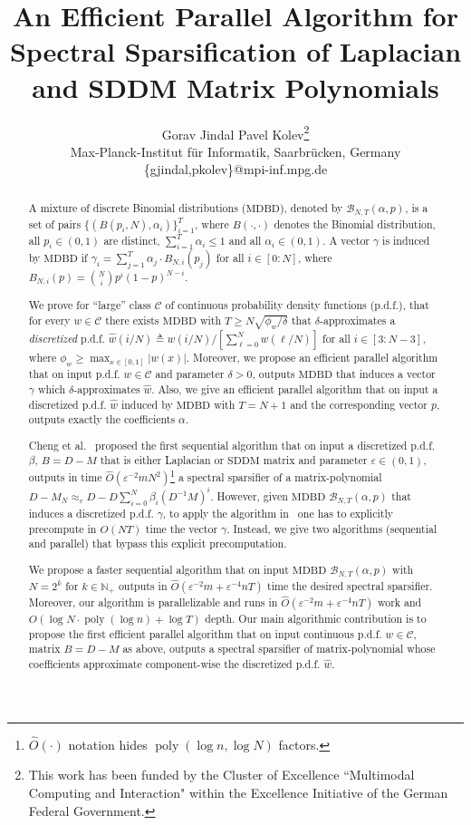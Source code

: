 \documentclass[11pt]{article}
\title{An Efficient Parallel Algorithm for Spectral Sparsification of Laplacian and SDDM Matrix Polynomials}
\author{
Gorav Jindal \qquad Pavel Kolev\footnote{This work has been funded by the Cluster of Excellence ``Multimodal Computing and Interaction" within the Excellence Initiative of the German Federal Government.}\\
Max-Planck-Institut f\"{u}r Informatik, Saarbr\"{u}cken, Germany\\
\{gjindal,pkolev\}@mpi-inf.mpg.de
}
\date{}
\newcommand{\phiw}{\phi_{w}}
\newcommand{\SDDM}{\mathrm{SDDM}}
\newcommand{\MDBD}{\mathrm{MDBD}}
\newcommand{\BNTap}{\mathcal{B}_{N,T}(\alpha,p)}
\newcommand{\hM}{\widehat{M}}
\newcommand{\hO}{\widehat{O}}
\newcommand{\hw}{\widehat{w}}
\newcommand{\Di}{D^{-1}}
\newcommand{\N}{\mathbb{N}}
\newcommand{\poly}{\operatorname{poly}}
\newcommand{\eps}{\epsilon}
\renewcommand{\leq}{\leqslant}
\renewcommand{\geq}{\geqslant}
\renewcommand{\eps}{\varepsilon}
\numberwithin{thm}{section}
\begin{document}
\maketitle

\begin{abstract}
A mixture of discrete Binomial distributions ($\MDBD$), denoted by $\BNTap$, is a set of pairs $\{(B(p_{i},N),\alpha_{i})\}_{i=1}^{T}$, where $B(\cdot,\cdot)$ denotes the Binomial distribution, all $p_{i}\in(0,1)$ are distinct, $\sum_{i=1}^{T}\alpha_{i}\leq1$ and all $\alpha_{i}\in(0,1)$. A vector $\gamma$ is induced by $\MDBD$ if $\gamma_{i}=\sum_{j=1}^{T}\alpha_{j}\cdot B_{N,i}(p_{j})$ for all $i\in[0:N]$, where $B_{N,i}(p)={N \choose i}p^{i}(1-p)^{N-i}$.

We prove for ``large'' class $\mathcal{C}$ of continuous probability density functions (p.d.f.), that for every $w\in\mathcal{C}$ there exists $\MDBD$ with $T\geq N\sqrt{\phiw/\delta}$ that $\delta$-approximates a \emph{discretized} p.d.f. $\widehat{w}(i/N)\triangleq w(i/N)/[\sum_{\ell=0}^{N}w(\ell/N)]$ for all $i\in[3:N-3]$, where $\phiw\geq\max_{x\in[0,1]}|w(x)|$. Moreover, we propose an efficient parallel algorithm that on input p.d.f. $w\in\mathcal{C}$ and parameter $\delta>0$, outputs $\MDBD$ that induces a vector $\gamma$ which $\delta$-approximates $\widehat{w}$. Also, we give an efficient parallel algorithm that on input a discretized p.d.f. $\widehat{w}$ induced by $\MDBD$ with $T=N+1$ and the corresponding vector $p$, outputs exactly the coefficients $\alpha$.

Cheng et al.~\cite{CCLPT15} proposed the first sequential algorithm that on input a discretized p.d.f. $\beta$, $B=D-M$ that is either Laplacian or $\SDDM$ matrix and parameter $\eps\in(0,1)$, outputs in time $\hO(\eps^{-2} m N^2)$\footnote{$\hO(\cdot)$ notation hides $\poly(\log n,\log N)$ factors.} a spectral sparsifier of a matrix-polynomial $D-\hM_{N} \approx_{\eps} D-D\sum_{i=0}^{N}\beta_{i}(\Di M)^i$. However, given $\MDBD$ $\BNTap$ that induces a discretized p.d.f. $\gamma$, to apply the algorithm in~\cite{CCLPT15} one has to explicitly precompute in $O(NT)$ time the vector $\gamma$. Instead, we give two algorithms (sequential and parallel) that bypass this explicit precomputation.

We propose a faster sequential algorithm that on input $\MDBD$ $\BNTap$ with $N=2^k$ for $k\in\N_+$ outputs in $\hO(\eps^{-2}m + \eps^{-4}nT)$ time the desired spectral sparsifier. Moreover, our algorithm is parallelizable and runs in $\hO(\eps^{-2}m + \eps^{-4}nT)$ work and $O(\log N\cdot\poly(\log n)+\log T)$ depth. Our main algorithmic contribution is to propose the first efficient parallel algorithm that on input continuous p.d.f. $w\in\mathcal{C}$, matrix $B=D-M$ as above, outputs a spectral sparsifier of matrix-polynomial whose coefficients approximate component-wise the discretized p.d.f. $\hw$.


\end{abstract}
\end{document}

